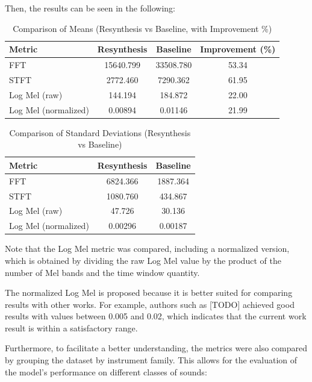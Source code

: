 \documentclass[sigconf,natbib=false]{acmart}
\newcommand{\sergio}[1]{{\color{red}[#1]}}
\begin{document}
Then, the results can be seen in the following:

\begin{table}
  \caption{Comparison of Means (Resynthesis vs Baseline, with Improvement \%)}
  \label{tab:metrics_means}
  \begin{tabular}{lccc}
    \toprule
    Metric & Resynthesis & Baseline & Improvement (\%) \\
    \midrule
    FFT   & 15640.799 & 33508.780 & 53.34 \\
    STFT  & 2772.460  & 7290.362  & 61.95 \\
    Log Mel (raw) & 144.194 & 184.872 & 22.00 \\
    Log Mel (normalized) & 0.00894 & 0.01146 & 21.99 \\
    \bottomrule
  \end{tabular}
\end{table}

\begin{table}
  \caption{Comparison of Standard Deviations (Resynthesis vs Baseline)}
  \label{tab:metrics_std}
  \begin{tabular}{lcc}
    \toprule
    Metric & Resynthesis & Baseline \\
    \midrule
    FFT   & 6824.366 & 1887.364 \\
    STFT  & 1080.760 & 434.867  \\
    Log Mel (raw) & 47.726 & 30.136 \\
    Log Mel (normalized) & 0.00296 & 0.00187 \\
    \bottomrule
  \end{tabular}
\end{table}

Note that the Log Mel metric was compared, including a normalized version, which is obtained by dividing the raw Log Mel value by the product of the number of Mel bands and the time window quantity.

The normalized Log Mel is proposed because it is better suited for comparing results with other works. For example, authors such as \sergio{TODO} achieved good results with values between 0.005 and 0.02, which indicates that the current work result is within a satisfactory range.

Furthermore, to facilitate a better understanding, the metrics were also compared by grouping the dataset by instrument family. This allows for the evaluation of the model's performance on different classes of sounds:
\end{document}
